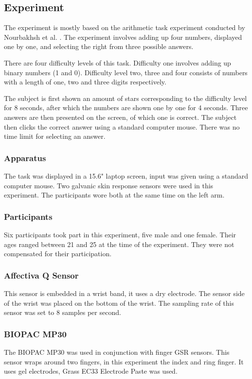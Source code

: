 \documentclass[12pt,fleqn,leqno,letterpaper]{article}
\begin{document}
\subsection{Experiment}
The experiment is mostly based on the arithmetic task experiment conducted by Nourbakhsh et al. \citep{Nourbakhsh2012}. The experiment involves adding up four numbers, displayed one by one, and selecting the right from three possible answers.

There are four difficulty levels of this task. Difficulty one involves adding up binary numbers (1 and 0). Difficulty level two, three and four consists of numbers with a length of one, two and three digits respectively.

The subject is first shown an amount of stars corresponding to the difficulty level for 8 seconds, after which the numbers are shown one by one for 4 seconds. Three answers are then presented on the screen, of which one is correct. The subject then clicks the correct answer using a standard computer mouse. There was no time limit for selecting an answer.


\subsubsection{Apparatus}
The task was displayed in a 15.6" laptop screen, input was given using a standard computer mouse.
Two galvanic skin response sensors were used in this experiment. The participants wore both at the same time on the left arm.

\subsubsection{Participants}
Six participants took part in this experiment, five male and one female. Their ages ranged between 21 and 25 at the time of the experiment. They were not compensated for their participation.


\subsubsection{Affectiva Q Sensor}
This sensor is embedded in a wrist band, it uses a dry electrode. The sensor side of the wrist was placed on the bottom of the wrist. The sampling rate of this sensor was set to 8 samples per second.

\subsubsection{BIOPAC MP30}
The BIOPAC MP30 was used in conjunction with finger GSR sensors. This sensor wraps around two fingers, in this experiment the index and ring finger. It uses gel electrodes, Grass EC33 Electrode Paste was used.
\end{document}
